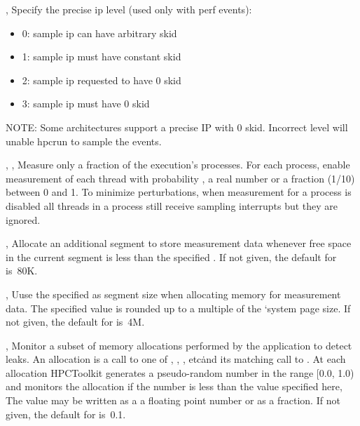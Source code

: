 \documentclass[english]{article}
\begin{document}
\begin{Description}
\item[\OptArg{-p}{level}, \OptArg{--precise-ip}{level}]
                       Specify the precise ip level (used only with perf events):
\begin{itemize}
 \item 0: sample ip can have arbitrary skid
 \item 1: sample ip must have constant skid
 \item 2: sample ip requested to have 0 skid
 \item 3: sample ip must have 0 skid
\end{itemize}
                       NOTE: Some architectures support a precise IP with 0 skid.
                             Incorrect level will unable hpcrun to sample the events.



\item[\OptArg{-f}{frac}, \OptArg{-fp}{frac}, \OptArg{--process-fraction}{frac}]
Measure only a fraction  of the execution's processes.
For each process, enable measurement of each thread with probability , a real number or a fraction (1/10) between 0 and 1.
To minimize perturbations, when measurement for a process is disabled
all threads in a process still receive sampling interrupts but they are ignored.

\item[\OptArg{-lm}{size}, \OptArg{--low-memsize}{size}]
Allocate an additional segment to store measurement data
whenever free space in the current segment is less than the specified .
If not given, the default for  is~80K.

\item[\OptArg{-m}{size}, \OptArg{--memsize}{size}]
Uuse the specified  as segment size when allocating memory for measurement data.
The specified value is rounded up to a multiple of the `system page size.
If not given, the default for  is~4M.

\item[\OptArg{-mp}{prob}, \OptArg{--memleak-prob}{prob}]
Monitor a subset of memory allocations performed by the application to detect leaks.
An allocation is a call to one of , , , etc\.
and its matching call to .
At each allocation HPCToolkit generates a pseudo-random number in the range [0.0, 1.0)
and monitors the allocation if the number is less than the value  specified here,
The value may be written as a a floating point number or as a fraction.
If not given, the default for  is~0.1.


\end{Description}
\end{document}

